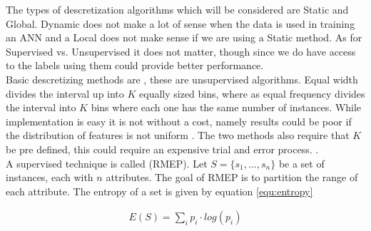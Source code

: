 The types of descretization algorithms which will be considered are Static and Global. Dynamic does not make a lot of sense when the data is used in training an ANN and a Local does not make sense if we are using a Static method. As for Supervised vs. Unsupervised it does not matter, though since we do have access to the labels using them could provide better performance.\\

Basic descretizing methods are , these are unsupervised algorithms. Equal width divides the interval up into $K$ equally sized bins, where as equal frequency divides the interval into $K$ bins where each one has the same number of instances. While implementation is easy it is not without a cost, namely results could be poor if the distribution of features is not uniform \cite{liu2002discretization}. The two methods also require that $K$ be pre defined, this could require an expensive trial and error process. \cite{liu2002discretization}.\\

A supervised technique is called  (RMEP). Let $S = \{s_1, ..., s_n\}$ be a set of instances, each with $n$ attributes. The goal of RMEP is to partition the range of each attribute. The entropy of a set is given by equation \ref{equ:entropy}

\begin{align}
	E(S) = \sum_{i} p_i \cdot log(p_i)
	\label{equ:entropy}
\end{align}


